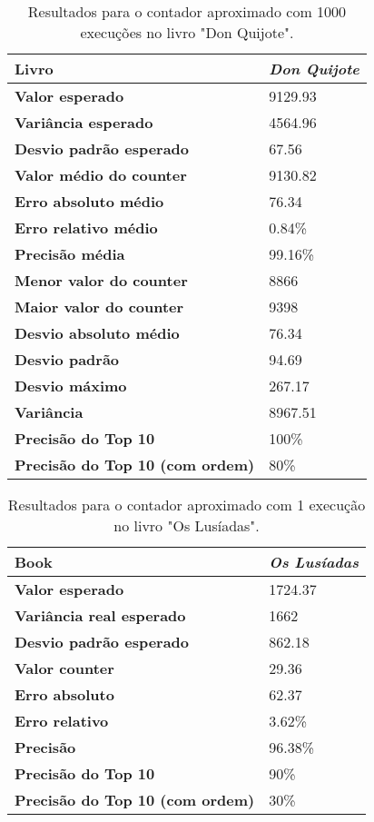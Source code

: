 \documentclass[shortpaper, portugues, times, mirror]{revdetua}
\begin{document}
\begin{table}[h!]
\centering
\begin{tabular}{|l|l|}
\hline
\textbf{Livro}            & \textit{Don Quijote} \\ \hline
\textbf{Valor esperado}         & 9129.93\\ \hline
\textbf{Variância esperado}       & 4564.96\\ \hline
\textbf{Desvio padrão esperado}   & 67.56\\ \hline
\textbf{Valor médio do counter}   & 9130.82\\ \hline
\textbf{Erro absoluto médio}   & 76.34\\ \hline
\textbf{Erro relativo médio}   & 0.84\%\\ \hline
\textbf{Precisão média}   & 99.16\%\\ \hline
\textbf{Menor valor do counter}   & 8866\\ \hline
\textbf{Maior valor do counter}   & 9398\\ \hline
\textbf{Desvio absoluto médio}   & 76.34\\ \hline
\textbf{Desvio padrão}   & 94.69\\ \hline
\textbf{Desvio máximo}   & 267.17\\ \hline
\textbf{Variância}   & 8967.51\\ \hline
\textbf{Precisão do Top 10}   & 100\%\\ \hline
\textbf{Precisão do Top 10 (com ordem)}   & 80\%\\ \hline
\end{tabular}
\caption{Resultados para o contador aproximado com 1000 execuções no livro "Don Quijote".}
\label{tab:approximate}
\end{table}

\begin{table}[h!]
\centering
\begin{tabular}{|l|l|}
\hline
\textbf{Book}            & \textit{Os Lusíadas}\\ \hline
\textbf{Valor esperado}         & 1724.37\\ \hline
\textbf{Variância real esperado}       & 1662\\ \hline
\textbf{Desvio padrão esperado}   & 862.18\\ \hline
\textbf{Valor counter}   & 29.36\\ \hline
\textbf{Erro absoluto}   & 62.37\\ \hline
\textbf{Erro relativo}   & 3.62\%\\ \hline
\textbf{Precisão}   & 96.38\%\\ \hline
\textbf{Precisão do Top 10}   & 90\%\\ \hline
\textbf{Precisão do Top 10 (com ordem)}   & 30\%\\ \hline
\end{tabular}
\caption{Resultados para o contador aproximado com 1 execução no livro "Os Lusíadas".}
\label{tab:approximate}
\end{table}
\end{document}
